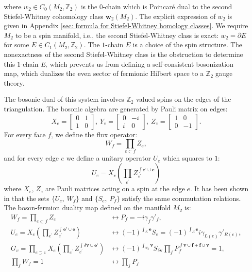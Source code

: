 \documentclass[12pt]{article}
\newcommand{\ZZ}{{\mathbb Z}}
\begin{document}
where $w_2 \in C_0(M_2,\ZZ_2)$ is the $0$-chain which is Poincar\'e dual to the second Stiefel-Whitney cohomology class $\boldsymbol w_2(M_2)$. The explicit expression of $w_2$ is given in Appendix \ref{sec: formula for Stiefel-Whitney homology classes}. We require $M_2$ to be a spin manifold, i.e., the second Stiefel-Whitney class is exact: $w_2 = \partial E$ for some $E \in C_1(M_2,\ZZ_2)$. The $1$-chain $E$ is a choice of the spin structure. The nonexactness of the second Stiefel-Whitney class is the obstruction to determine this $1$-chain $E$, which prevents us from defining a self-consistent bosonization map, which dualizes the even sector of fermionic Hilbert space to a $\ZZ_2$ gauge theory.

The bosonic dual of this system involves $\ZZ_2$-valued spins on the edges of the triangulation. The bosonic algebra are generated by Pauli matrix on edges:
\begin{equation}
X_e=
\begin{bmatrix} 
0 & 1 \\
1 & 0 
\end{bmatrix},
~Y_e=
\begin{bmatrix} 
0 & -i \\
i & 0 
\end{bmatrix},
~Z_e=
\begin{bmatrix} 
1 & 0 \\
0 & -1 
\end{bmatrix}.
\end{equation}
For every face $f$, we define the flux operator:
\begin{equation}
    W_f = \prod_{e \subset f} Z_e,
\end{equation}
and for every edge $e$ we define a unitary operator ${U}_e$ which squares to $1$:
\begin{equation}
    {U}_e =  X_e(\prod_{e^\prime} Z_{e^\prime}^{\int \boldsymbol e' \cup \boldsymbol e}) 
\end{equation}
where $X_e$, $Z_e$ are Pauli matrices acting on a spin at the edge $e$. 
It has been shown in \cite{CKR18} that the sets $\{U_e,~W_f \}$ and $\{S_e,~P_f\}$ satisfy the same commutation relations. The boson-fermion duality map defined on the manifold $M_2$ is:
\begin{equation}
\begin{split}
W_f = \prod_{e \subset f} Z_e&\longleftrightarrow P_f = -i\gamma_f\gamma'_f, \\
{U}_e = X_e (\prod_{e^\prime} Z_{e^\prime}^{\int \boldsymbol e' \cup \boldsymbol e})  &\longleftrightarrow (-1)^{\int_E \boldsymbol e} S_e = (-1)^{\int_E \boldsymbol e} i\gamma_{L(e)}\gamma'_{R(e)},\\
G_v = \prod_{e \supset v} X_e  (\prod_{e^\prime} Z_{e^\prime}^{\int \delta \boldsymbol  v \cup \boldsymbol e'}) &\longleftrightarrow (-1)^{\int_{w_2} \boldsymbol v} S_{ \delta \boldsymbol v} \prod_{f} P_f^{\int \boldsymbol v \cup \boldsymbol f + \boldsymbol f \cup \boldsymbol v} = 1,  \\
\prod_f W_f = 1 &\longleftrightarrow \prod_f P_f
\end{split}
\label{eq: 2d boson-fermion duality}
\end{equation}
\end{document}
